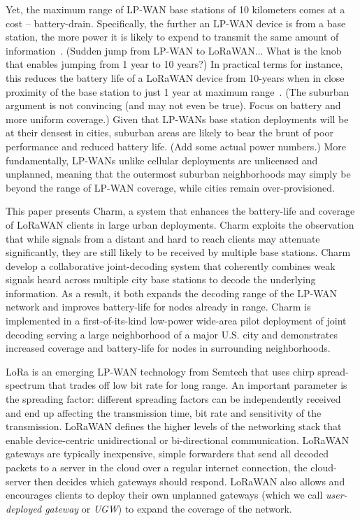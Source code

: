 Yet, the maximum range of LP-WAN base stations of 10 kilometers comes at a cost -- battery-drain. 
Specifically, the further an LP-WAN device is from a base station, the more power it is likely to expend to transmit the same amount of information{\color{red}~\cite{}}. 
{\color{blue} (Sudden jump from LP-WAN to LoRaWAN... What is the knob that enables jumping from 1 year to 10 years?)}
In practical terms for instance, this reduces the battery life of a LoRaWAN device from 10-years when in close proximity of the base station to just 1 year at maximum range{\color{red}~\cite{}}.
{\color{blue} (The suburban argument is not convincing (and may not even be true). Focus on battery and more uniform coverage.)} Given that LP-WANs base station deployments will be at their densest in cities, suburban areas are likely to bear the brunt of poor performance and reduced battery life.
{\color{blue} (Add some actual power numbers.)}
More fundamentally, LP-WANs unlike cellular deployments are unlicensed and unplanned, meaning that the outermost suburban neighborhoods may simply be beyond the range of LP-WAN coverage, while cities remain over-provisioned. 


This paper presents Charm, a system that enhances the battery-life and coverage of LoRaWAN clients in large urban deployments.
Charm exploits the observation that while signals from a distant and hard to reach clients may attenuate significantly, they are still likely to be received by multiple base stations. 
Charm develop a collaborative joint-decoding system that coherently combines weak signals heard across multiple city base stations to decode the underlying information. 
As a result, it both expands the decoding range of the LP-WAN network and improves battery-life for nodes already in range. 
Charm is implemented in a first-of-its-kind low-power wide-area pilot deployment of joint decoding serving a large neighborhood of a major U.S. city and demonstrates increased coverage and battery-life for nodes in surrounding neighborhoods. 

LoRa is an emerging LP-WAN technology from Semtech that uses chirp spread-spectrum that trades off low bit rate for long range. 
An important parameter is the spreading factor: different spreading factors can be independently received and end up affecting the transmission time, bit rate and sensitivity of the transmission. 
LoRaWAN defines the higher levels of the networking stack that enable device-centric unidirectional or bi-directional communication. 
LoRaWAN gateways are typically inexpensive, simple forwarders that send all decoded packets to a server in the cloud over a regular internet connection, the cloud-server then decides which gateways should respond. 
LoRaWAN also allows and encourages clients to deploy their own unplanned gateways (which we call \textit{user-deployed gateway} or \textit{UGW}) to expand the coverage of the network.

